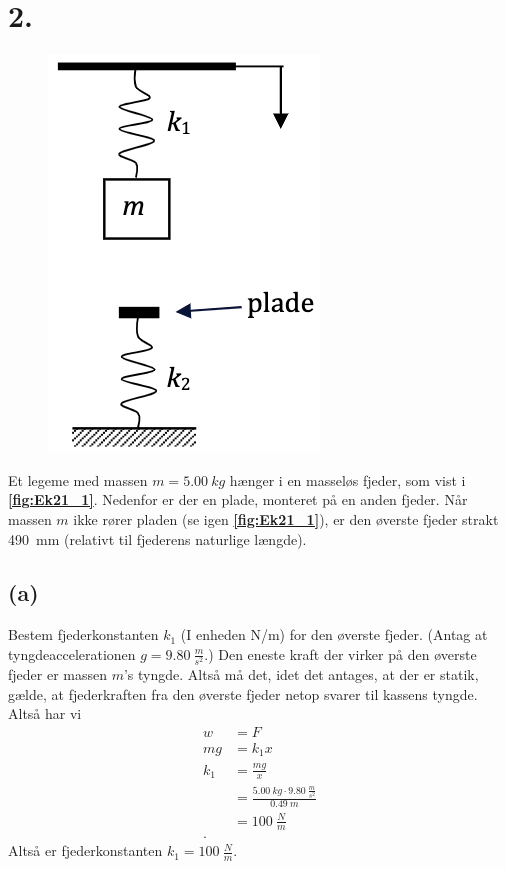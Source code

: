 \documentclass[12pt]{article}
\theoremstyle{definition}
\begin{document}
\section*{2.}
\begin{figure} [ht]
  \centering
  \caption{}
  \includegraphics[width=0.25\linewidth]{../figures/Ek21_1.png}
  \label{fig:Ek21_1}
\end{figure}

Et legeme med massen $m = \qty{5,00}{kg} $ hænger i en masseløs fjeder, som vist i \textbf{\autoref{fig:Ek21_1}}. Nedenfor er der en plade, monteret på en anden fjeder. Når massen $m$ ikke rører pladen (se igen \textbf{\autoref{fig:Ek21_1}}), er den øverste fjeder strakt \qty{490}{mm}  (relativt til fjederens naturlige længde).

\subsection*{(a)}
Bestem fjederkonstanten $k_1$ (I enheden \unit{N/m}) for den øverste fjeder. (Antag at tyngdeaccelerationen $g = \qty{9,80}{\frac{m}{s^2}}$.)
\bigbreak
Den eneste kraft der virker på den øverste fjeder er massen $m$'s tyngde. Altså må det, idet det antages, at der er statik, gælde, at fjederkraften fra den øverste fjeder netop svarer til kassens tyngde. Altså har vi
\begin{align*}
  w &= F \\
  mg &= k_1x \\
  k_1 &= \frac{mg}{x} \\
  &= \frac{\qty{5,00}{kg} \cdot \qty{9,80}{\frac{m}{s^2}}}{\qty{0,49}{m}} \\
  &= \qty{100}{\frac{N}{m}}  \\
.\end{align*}
Altså er fjederkonstanten $k_1 = \qty{100}{\frac{N}{m}}$. 
\end{document}
